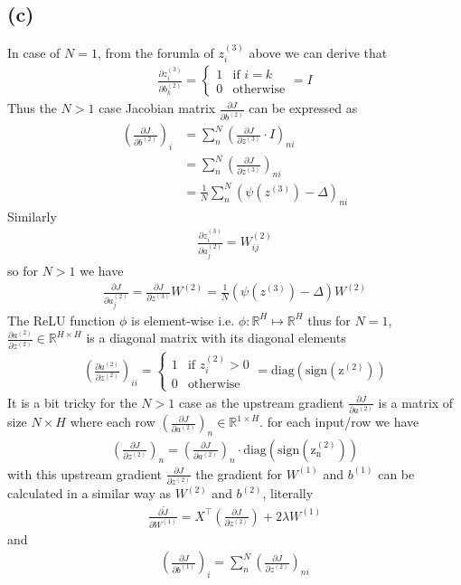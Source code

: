 \documentclass{article}
\newcommand{\bb}{b^{(2)}}
\newcommand{\ab}{a^{(2)}}
\newcommand{\zc}{z^{(3)}}
\newcommand{\Wb}{W^{(2)}}
\begin{document}
\subsection*{(c)}
\newcommand{\zb}{z^{(2)}}
\newcommand{\Wa}{W^{(1)}}
\newcommand{\ba}{b^{(1)}}
In case of $N = 1$, from the forumla of $\zc_i$ above we can derive that
\begin{align*}
    \frac{\partial \zc_i}{\partial \bb_k} = \begin{cases}
        1 & \text{if } i = k\\
        0 & \text{otherwise}
    \end{cases} = I
\end{align*}
Thus the $N > 1$ case Jacobian matrix $\frac{\partial J}{\partial \bb}$ can be expressed as
\begin{align*}
    \left(\frac{\partial J}{\partial \bb}\right)_i &= \sum_{n}^{N}\left(\frac{\partial J}{\partial \zc} \cdot I\right)_{ni}\\
    &= \sum_{n}^{N}\left(\frac{\partial J}{\partial \zc}\right)_{ni}\\
    &= \frac{1}{N}\sum_{n}^{N}\left(\psi(z^{(3)}) - \Delta\right)_{ni}
\end{align*}
Similarly
\begin{align*}
    \frac{\partial \zc_i}{\partial \ab_j} = \Wb_{ij}
\end{align*}
so for $N > 1$ we have
\begin{align*}
\frac{\partial J}{\partial \ab_j} = \frac{\partial J}{\partial \zc}  \Wb = 
\frac{1}{N}\left(\psi(z^{(3)}) - \Delta\right) \Wb
\end{align*}
The ReLU function $\phi$ is element-wise i.e. $\phi : \mathbb{R}^H \mapsto \mathbb{R}^H$
thus for $N = 1$, $\frac{\partial \ab}{\partial \zb} \in \mathbb{R}^{H\times H}$ is a diagonal matrix with its diagonal elements
\begin{align*}
    \left(\frac{\partial \ab}{\partial \zb}\right)_{ii} = \begin{cases}
        1 & \text{if } \zb_{i} > 0\\
        0 & \text{otherwise}
    \end{cases} = \mathrm{diag}(\mathrm{sign(\zb)})
\end{align*}
It is a bit tricky for the $N > 1$ case
as the upstream gradient $\frac{\partial J}{\partial \ab}$ is a matrix of size $N\times H$
where each row $(\frac{\partial J}{\partial \ab})_n\in\mathbb{R}^{1\times H}$.
for each input/row we have 
\begin{align*}
    (\frac{\partial J}{\partial \zb})_n = (\frac{\partial J}{\partial \ab})_n \cdot \mathrm{diag}(\mathrm{sign(\zb_n)})
\end{align*}
with this upstream gradient $\frac{\partial J}{\partial \zb}$
the gradient for $\Wa$ and $\ba$ can be calculated in a similar way as $\Wb$ and $\bb$, literally
\begin{align*}
    \frac{\partial \tilde{J}}{\partial \Wa} = X^\top\left(\frac{\partial J}{\partial \zb}\right) + 2\lambda\Wa
\end{align*}
and 
\begin{align*}
    \left(\frac{\partial J}{\partial \ba}\right)_i = \sum_{n}^{N}\left(\frac{\partial J}{\partial \zb}\right)_{ni}
\end{align*}
\end{document}
